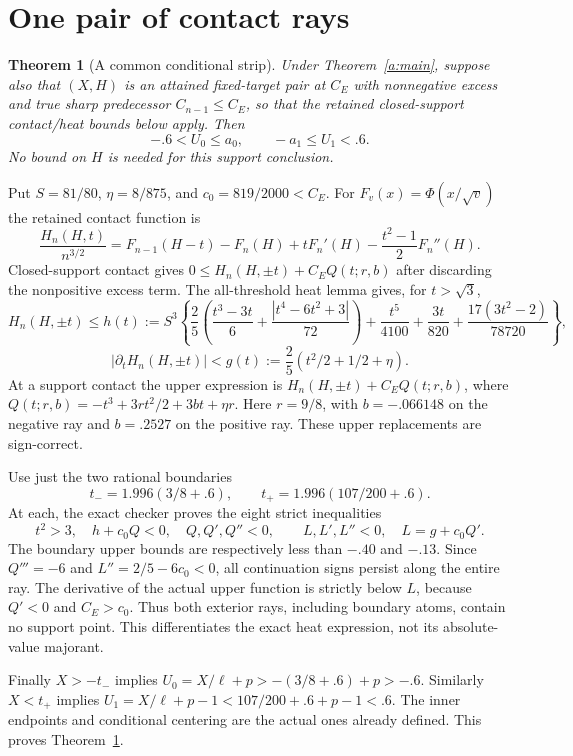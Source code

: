 \documentclass[11pt]{article}
\newtheorem{theorem}{Theorem}\newtheorem{lemma}[theorem]{Lemma}
\begin{document}
\section{One pair of contact rays}
\begin{theorem}[A common conditional strip]\label{a:strip}
Under Theorem~\ref{a:main}, suppose also that $(X,H)$ is an attained
fixed-target pair at $C_E$ with nonnegative excess and true sharp predecessor
$C_{n-1}\le C_E$, so that the retained closed-support contact/heat bounds
below apply. Then
\[
                  -.6<U_0\le a_0,\qquad -a_1\le U_1<.6.
\]
No bound on $H$ is needed for this support conclusion.
\end{theorem}
Put $S=81/80$, $\eta=8/875$, and $c_0=819/2000<C_E$.
For $F_v(x)=\Phi(x/\sqrt v)$ the retained contact function is
\[
 \frac{H_n(H,t)}{n^{3/2}}=F_{n-1}(H-t)-F_n(H)+tF_n'(H)
                                -\frac{t^2-1}{2}F_n''(H).
\]
Closed-support contact gives
$0\le H_n(H,\pm t)+C_EQ(t;r,b)$ after discarding the nonpositive
excess term. The all-threshold heat lemma gives, for $t>\sqrt3$,
\[
 H_n(H,\pm t)\le h(t):=S^3\left\{\frac25\left(
 \frac{t^3-3t}{6}+\frac{|t^4-6t^2+3|}{72}\right)
 +\frac{t^5}{4100}+\frac{3t}{820}+\frac{17(3t^2-2)}{78720}\right\},
\]
\[
 |\partial_tH_n(H,\pm t)|<g(t):=\frac25(t^2/2+1/2+\eta).
\]
At a support contact the upper expression is
$H_n(H,\pm t)+C_EQ(t;r,b)$, where
$Q(t;r,b)=-t^3+3rt^2/2+3bt+\eta r$.
Here $r=9/8$, with $b=-.066148$ on the negative ray and $b=.2527$ on
the positive ray. These upper replacements are sign-correct.

Use just the two rational boundaries
\[
              t_-=1.996(3/8+.6),\qquad
              t_+=1.996(107/200+.6).
\]
At each, the exact checker proves the eight strict inequalities
\[
 t^2>3,\quad h+c_0Q<0,\quad Q,Q',Q''<0,
 \qquad L,L',L''<0,\quad L=g+c_0Q'.
\]
The boundary upper bounds are respectively less than $-.40$ and $-.13$.
Since $Q'''=-6$ and $L''=2/5-6c_0<0$, all continuation signs persist
along the entire ray. The derivative of the actual upper function is
strictly below $L$, because $Q'<0$ and $C_E>c_0$. Thus both exterior
rays, including boundary atoms, contain no support point. This differentiates
the exact heat expression, not its absolute-value majorant.

Finally $X>-t_-$ implies $U_0=X/\ell+p>-(3/8+.6)+p>-.6$.
Similarly $X<t_+$ implies $U_1=X/\ell+p-1<107/200+.6+p-1<.6$.
The inner endpoints and conditional centering are the actual ones already
defined. This proves Theorem~\ref{a:strip}.
\end{document}

